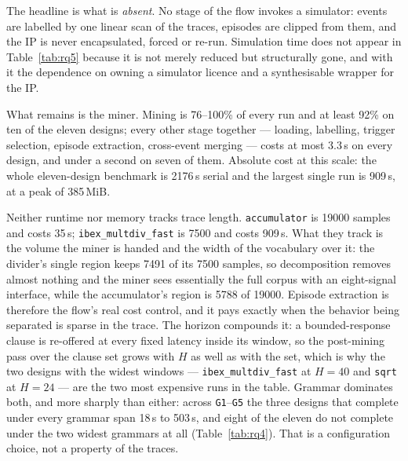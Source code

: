 The headline is what is \emph{absent}. No stage of the flow invokes a simulator: events are
labelled by one linear scan of the traces, episodes are clipped from them, and the IP is
never encapsulated, forced or re-run. Simulation time does not appear in Table~\ref{tab:rq5}
because it is not merely reduced but structurally gone, and with it the dependence on owning
a simulator licence and a synthesisable wrapper for the IP.

What remains is the miner. Mining is 76--100\% of every run and at least 92\% on ten of the
eleven designs; every other stage together --- loading, labelling, trigger selection, episode
extraction, cross-event merging --- costs at most 3.3\,s on every design, and under a second
on seven of them. Absolute cost at this scale: the whole eleven-design benchmark is 2176\,s
serial and the largest single run is 909\,s, at a peak of 385\,MiB.

Neither runtime nor memory tracks trace length. \texttt{accumulator} is 19000 samples and
costs 35\,s; \texttt{ibex\_multdiv\_fast} is 7500 and costs 909\,s. What they track is the
volume the miner is handed and the width of the vocabulary over it: the divider's single
region keeps 7491 of its 7500 samples, so decomposition removes almost nothing and the miner
sees essentially the full corpus with an eight-signal interface, while the accumulator's
region is 5788 of 19000. Episode extraction is therefore the flow's real cost control, and it
pays exactly when the behavior being separated is sparse in the trace. The horizon compounds
it: a bounded-response clause is re-offered at every fixed latency inside its window, so the
post-mining pass over the clause set grows with $H$ as well as with the set, which is why the
two designs with the widest windows --- \texttt{ibex\_multdiv\_fast} at $H=40$ and
\texttt{sqrt} at $H=24$ --- are the two most expensive runs in the table.
Grammar dominates both, and more sharply than either: across \texttt{G1}--\texttt{G5} the
three designs that complete under every grammar span 18\,s to 503\,s, and eight of the eleven
do not complete under the two widest grammars at all (Table~\ref{tab:rq4}). That is a
configuration choice, not a property of the traces.

